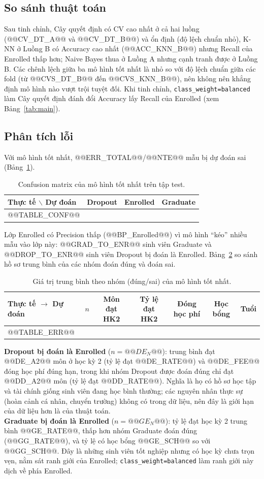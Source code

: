 \documentclass[12pt,a4paper]{article}
\begin{document}
\subsection{So sánh thuật toán}
Sau tinh chỉnh, Cây quyết định có CV cao nhất ở cả hai luồng (@@CV_DT_A@@ và @@CV_DT_B@@) và ổn định (độ lệch chuẩn nhỏ), K-NN ở Luồng B có
Accuracy cao nhất (@@ACC_KNN_B@@) nhưng Recall của Enrolled thấp hơn; Naive Bayes thua ở Luồng A nhưng cạnh tranh được ở Luồng B. Các chênh lệch giữa ba mô hình
tốt nhất là nhỏ so với độ lệch chuẩn giữa các fold (từ @@CVS_DT_B@@ đến @@CVS_KNN_B@@), nên không nên khẳng định mô hình nào vượt trội tuyệt đối. Khi tinh chỉnh,
\texttt{class\_weight=balanced} làm Cây quyết định đánh đổi Accuracy lấy Recall của Enrolled (xem Bảng~\ref{tab:main}).

\subsection{Phân tích lỗi}
Với mô hình tốt nhất, @@ERR_TOTAL@@/@@NTE@@ mẫu bị dự đoán sai (Bảng~\ref{tab:conf}).
\begin{table}[H]\centering\small
\begin{tabular}{@{}lccc@{}}\toprule
Thực tế $\backslash$ Dự đoán & Dropout & Enrolled & Graduate\\\midrule
@@TABLE_CONF@@
\bottomrule\end{tabular}\caption{Confusion matrix của mô hình tốt nhất trên tập test.}\label{tab:conf}\end{table}
Lớp Enrolled có Precision thấp (@@BP_Enrolled@@) vì mô hình ``kéo'' nhiều mẫu vào lớp này: @@GRAD_TO_ENR@@ sinh viên Graduate và @@DROP_TO_ENR@@ sinh viên Dropout
bị đoán là Enrolled. Bảng~\ref{tab:err} so sánh hồ sơ trung bình của các nhóm đoán đúng và đoán sai.
\begin{table}[H]\centering\small
\begin{tabular}{@{}lrccccc@{}}\toprule
Thực tế $\to$ Dự đoán & $n$ & Môn đạt HK2 & Tỷ lệ đạt HK2 & Đóng học phí & Học bổng & Tuổi\\\midrule
@@TABLE_ERR@@
\bottomrule\end{tabular}\caption{Giá trị trung bình theo nhóm (đúng/sai) của mô hình tốt nhất.}\label{tab:err}\end{table}
\textbf{Dropout bị đoán là Enrolled} ($n=@@DE_N@@$): trung bình đạt @@DE_A2@@ môn ở học kỳ 2 (tỷ lệ đạt @@DE_RATE@@) và @@DE_FEE@@ đóng học phí đúng hạn,
trong khi nhóm Dropout được đoán đúng chỉ đạt @@DD_A2@@ môn (tỷ lệ đạt @@DD_RATE@@). Nghĩa là họ có hồ sơ học tập và tài chính giống sinh viên đang học bình thường;
các nguyên nhân thực sự (hoàn cảnh cá nhân, chuyển trường) không có trong dữ liệu, nên đây là giới hạn của dữ liệu hơn là của thuật toán.\\
\textbf{Graduate bị đoán là Enrolled} ($n=@@GE_N@@$): tỷ lệ đạt học kỳ 2 trung bình @@GE_RATE@@, thấp hơn nhóm Graduate đoán đúng (@@GG_RATE@@), và tỷ lệ có học bổng
@@GE_SCH@@ so với @@GG_SCH@@. Đây là những sinh viên tốt nghiệp nhưng có học kỳ chưa trọn vẹn, nằm sát ranh giới của Enrolled;
\texttt{class\_weight=balanced} làm ranh giới này dịch về phía Enrolled.
\end{document}
